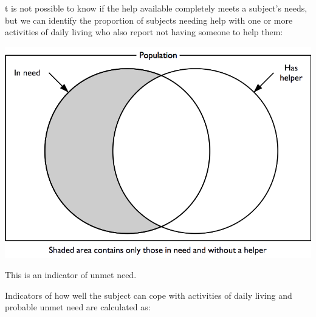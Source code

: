 \documentclass[12pt,a4paper]{book}
\theoremstyle{definition}
\theoremstyle{definition}
\theoremstyle{definition}
\theoremstyle{remark}
\begin{document}
t is not possible to know if the help available completely meets a
subject's needs, but we can identify the proportion of subjects needing
help with one or more activities of daily living who also report not
having someone to help them:

\begin{center}\includegraphics[width=800pt]{figures/indicators17} \end{center}

This is an indicator of unmet need.

Indicators of how well the subject can cope with activities of daily
living and probable unmet need are calculated as:
\end{document}
